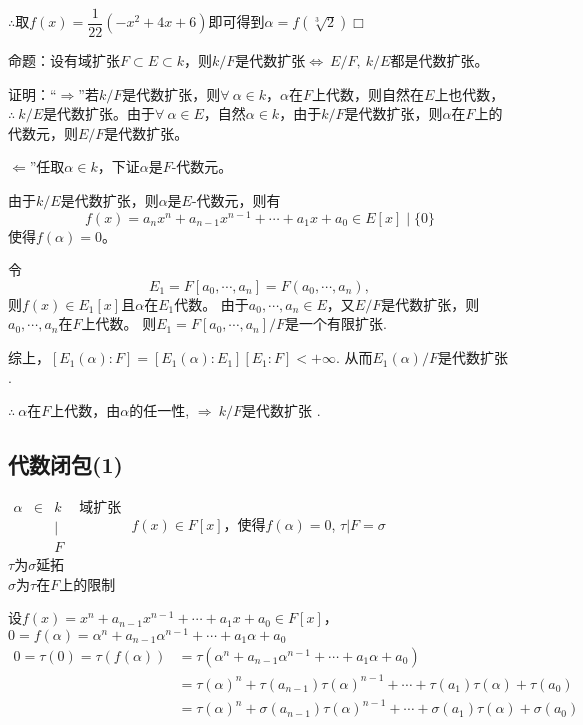\documentclass[UTF8]{article}
\begin{document}
\quad $\therefore$取$f(x)=\dfrac{1}{22}\left(-x^{2}+4 x+6\right)$即可得到$\alpha=f\left(\sqrt[3]{2}\right)$\hfill$\Box$

\quad

\noindent
{}
\setlength{\hangindent}{3em}
命题：设有域扩张$F\subset E\subset k$，则$k/F$是代数扩张$\Longleftrightarrow\ E/F,\ k/E$都是代数扩张。

证明：“$\Longrightarrow$”\quad 若$k/F$是代数扩张，则$\forall\ \alpha\in k$，$\alpha$在$F$上代数，则自然在$E$上也代数，$\therefore\ k/E$是代数扩张。由于$\forall\ \alpha\in E$，自然$\alpha\in k$，由于$k/F$是代数扩张，则$\alpha$在$F$上的代数元，则$E/F$是代数扩张。

$\Longleftarrow$”\quad 任取$\alpha\in k$，下证$\alpha$是$F$-代数元。

由于$k/E$是代数扩张，则$\alpha$是$E$-代数元，则有
$$
f(x)=a_{n} x^{n}+a_{n-1} x^{n-1}+\cdots+a_{1} x+a_{0}\in E[x] \mid \{ 0\}
$$
使得$f(\alpha)=0$。

令
$$E_1=F\left[ a_0,\cdots,a_n\right]=F\left( a_0,\cdots,a_n\right),$$
则$f(x)\in E_1[x]$且$\alpha$在$E_1$代数。 
由于$a_0,\cdots,a_n\in E$，又$E/F$是代数扩张，则$a_0,\cdots,a_n$在$F$上代数。 
则$E_1=F\left[ a_0,\cdots,a_n\right]/F$是一个有限扩张.

综上，$\left[ E_1\left( \alpha\right): F\right]=\left[ E_1\left( \alpha\right): E_1\right]\left[ E_1: F\right]<+\infty$.
从而$E_1\left( \alpha\right)/F$是代数扩张 .

$\therefore\ \alpha$在$F$上代数，由$\alpha$的任一性,
$\Rightarrow\ k/F$是代数扩张 .

\subsection{代数闭包(1)}

$\begin{array}{cccc}
\alpha &\in &k &\text{ 域扩张 }\\ 
&&\mid &\\ 
&&F &
\end{array}$\qquad $f(x)\in F[x]$，使得$f(\alpha)=0$,
$\tau|F=\sigma$ \\ 
$\tau$为$\sigma$延拓\\ 
$\sigma$为$\tau$在$F$上的限制

设$f(x)=x^{n}+a_{n-1} x^{n-1}+\cdots+a_{1} x+a_{0}\in F[x]$，\ $0=f(\alpha)=\alpha^{n}+a_{n-1}\alpha^{n-1}+\cdots +a_{1}\alpha+a_{0}$
$$
\begin{aligned}
0=\tau\left( 0\right)=\tau\left( f\left( \alpha\right)\right)&=\tau\left( \alpha^{n}+a_{n-1}\alpha^{n-1}+\cdots+a_{1}\alpha+a_{0}\right)\\ 
&=\tau\left( \alpha\right)^n+\tau\left( a_{n-1}\right)\tau\left( \alpha\right)^{n-1}+\cdots+\tau\left( a_1\right)\tau\left( \alpha\right)+\tau\left( a_0\right)\\ 
&=\tau\left( \alpha\right)^n+\sigma\left( a_{n-1}\right)\tau\left( \alpha\right)^{n-1}+\cdots+\sigma\left( a_1\right)\tau\left( \alpha\right)+\sigma\left( a_0\right)
\end{aligned}
$$
\end{document}
